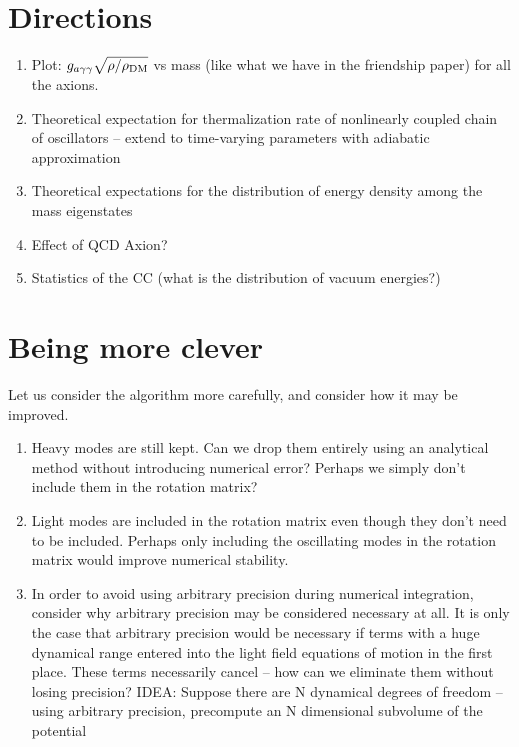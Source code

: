 \documentclass{article}
\begin{document}
\section{Directions}
\begin{enumerate}
    \item Plot: $g_{a\gamma\gamma}\sqrt{\rho/\rho_{\rm DM}}$ vs mass (like what we have in the friendship paper) for all the axions.
    \item Theoretical expectation for thermalization rate of nonlinearly coupled chain of oscillators -- extend to time-varying parameters with adiabatic approximation
    \item Theoretical expectations for the distribution of energy density among the mass eigenstates
    \item Effect of QCD Axion?
    \item Statistics of the CC (what is the distribution of vacuum energies?)
\end{enumerate}

\section{Being more clever}
Let us consider the algorithm more carefully, and consider how it may be improved.
\begin{enumerate}
    \item Heavy modes are still kept. Can we drop them entirely using an analytical method without introducing numerical error? Perhaps we simply don't include them in the rotation matrix?
    \item Light modes are included in the rotation matrix even though they don't need to be included. Perhaps only including the oscillating modes in the rotation matrix would improve numerical stability.
    \item In order to avoid using arbitrary precision during numerical integration, consider why arbitrary precision may be considered necessary at all. It is only the case that arbitrary precision would be necessary if terms with a huge dynamical range entered into the light field equations of motion in the first place. These terms necessarily cancel -- how can we eliminate them without losing precision? IDEA: Suppose there are N dynamical degrees of freedom -- using arbitrary precision, precompute an N dimensional subvolume of the potential
\end{enumerate}
\end{document}
